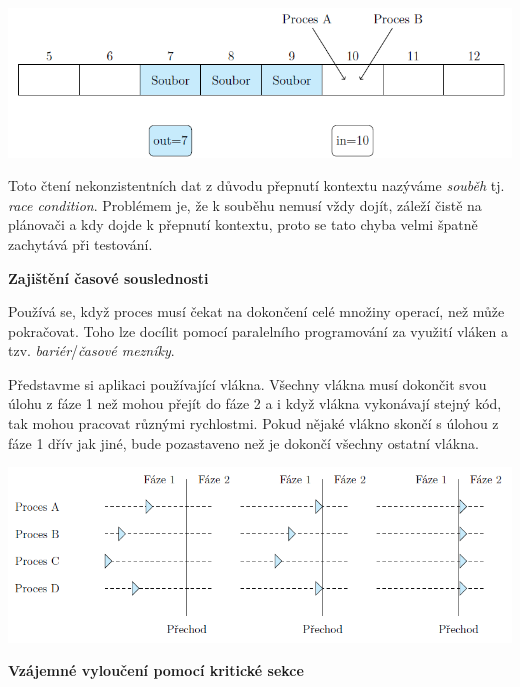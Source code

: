 \begin{center}
    \includegraphics[scale=1]{images/proc_soubeh.png}
\end{center}

Toto čtení nekonzistentních dat z důvodu přepnutí kontextu nazýváme \textit{souběh} tj. \textit{race condition}. Problémem je, že k souběhu nemusí vždy dojít, záleží čistě na plánovači a kdy dojde k přepnutí kontextu, proto se tato chyba velmi špatně zachytává při testování. 

\begin{large}
    \vspace{0,5cm}
    \textbf{Zajištění časové souslednosti}
\end{large}

Používá se, když proces musí čekat na dokončení celé množiny operací, než může pokračovat. Toho lze docílit pomocí paralelního programování za využití vláken a tzv. \textit{bariér}/\textit{časové mezníky}. 

\vspace{0,5cm}

Představme si aplikaci používající vlákna. Všechny vlákna musí dokončit svou úlohu z fáze 1 než mohou přejít do fáze 2 a i když vlákna vykonávají stejný kód, tak mohou pracovat různými rychlostmi. Pokud nějaké vlákno skončí s úlohou z fáze 1 dřív jak jiné, bude pozastaveno než je dokončí všechny ostatní vlákna.

\begin{center}
    \includegraphics[scale=1]{images/proc_barrier.png}
\end{center}

\begin{large}
    \vspace{0,5cm}
    \textbf{Vzájemné vyloučení pomocí kritické sekce}
\end{large}

